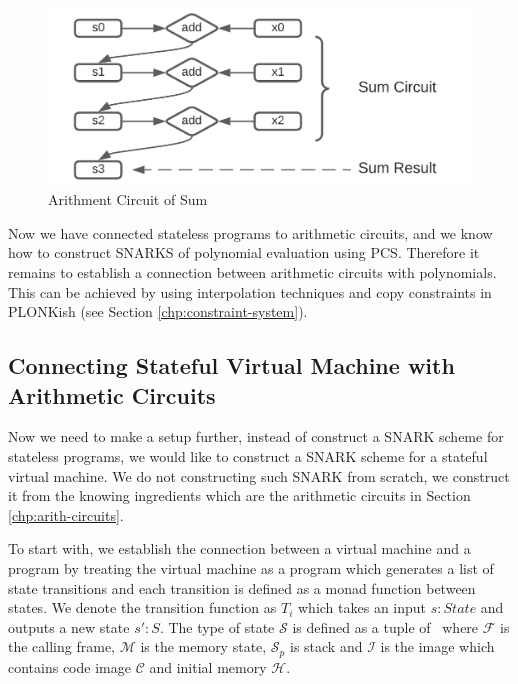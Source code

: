 \begin{figure}[!ht]
\centerline{
\includegraphics[scale=0.8]{figs/arithment-circuit.png}
}
\caption{Arithment Circuit of Sum}\label{fig:sum-gates}
\end{figure}

Now we have connected stateless programs to arithmetic circuits, and we know how to construct SNARKS of polynomial evaluation using PCS. Therefore it remains to establish a connection between arithmetic circuits with polynomials. This can be achieved by using interpolation techniques and copy constraints in PLONKish (see Section \ref{chp:constraint-system}).

\subsection{Connecting Stateful Virtual Machine with Arithmetic Circuits}
\label{chp:encode-state-in-circuits}
Now we need to make a setup further, instead of construct a SNARK scheme for stateless programs, we would like to construct a SNARK scheme for a stateful virtual machine. We do not constructing such SNARK from scratch, we construct it from the knowing ingredients which are the arithmetic circuits in Section \ref{chp:arith-circuits}. 

To start with, we establish the connection between a virtual machine and a program by treating the virtual machine as a program which generates a list of state transitions and each transition is defined as a monad function between states. We denote the transition function as $T_i$ which takes an input $s:State$ and outputs a new state $s':S$. The type of state $\mathcal{S}$ is defined as a tuple of \fullstate \, where $\mathcal{F}$ is the calling frame, $\mathcal{M}$ is the memory state, $\mathcal{S}_p$ is stack and $\mathcal{I}$ is the image which contains code image $\mathcal{C}$ and initial memory $\mathcal{H}$.

